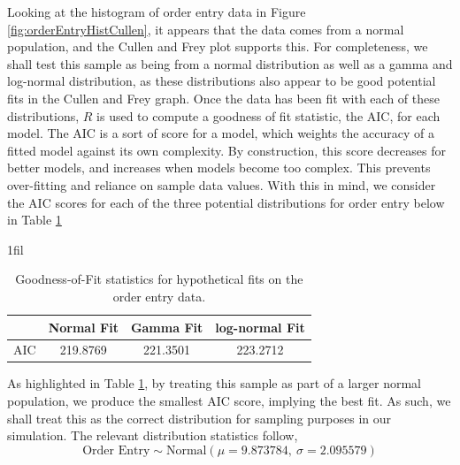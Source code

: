 \documentclass[10pt]{report}            %
\makeatletter
\newcommand*{\centerfloat}{%
  \parindent \z@
  \leftskip \z@ \@plus 1fil \@minus \textwidth
  \rightskip\leftskip
  \parfillskip \z@skip}
\makeatother
\begin{document}
Looking at the histogram of order entry data in Figure \ref{fig:orderEntryHistCullen}, it appears that the data comes from a normal population, and the Cullen and Frey plot supports this. For completeness, we shall test this sample as being from a normal distribution as well as a gamma and log-normal distribution, as these distributions also appear to be good potential fits in the Cullen and Frey graph. Once the data has been fit with each of these distributions, $R$ is used to compute a goodness of fit statistic, the AIC, for each model. The AIC is a sort of score for a model, which weights the accuracy of a fitted model against its own complexity. By construction, this score decreases for better models, and increases when models become too complex. This prevents over-fitting and reliance on sample data values. With this in mind, we consider the AIC scores for each of the three potential distributions for order entry below in Table \ref{table:entryGOF}
\begin{table}[H]
\centerfloat
\begin{tabular}{|r||c|c|c|}
\hline
& Normal Fit & Gamma Fit & log-normal Fit \\\hline
AIC & \cellcolor{green!25}219.8769 & 221.3501 & 223.2712\\\hline
\end{tabular}
\caption{Goodness-of-Fit statistics for hypothetical fits on the order entry data.}
\label{table:entryGOF}
\end{table}
As highlighted in Table \ref{table:entryGOF}, by treating this sample as part of a larger normal population, we produce the smallest AIC score, implying the best fit. As such, we shall treat this as the correct distribution for sampling purposes in our simulation. The relevant distribution statistics follow,
\[\text{Order Entry}\sim \text{Normal}(\mu=9.873784,\ \sigma=2.095579)\]
\end{document}
